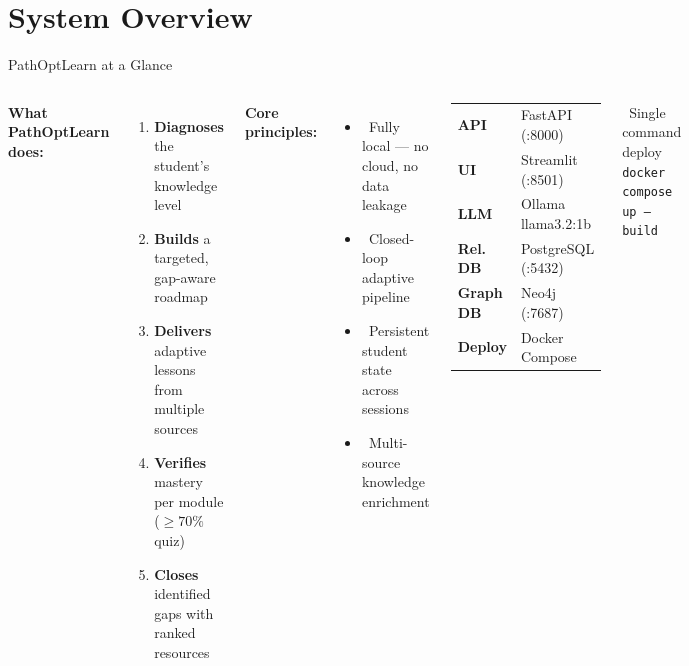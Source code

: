 \documentclass[aspectratio=169,9pt]{beamer}
\begin{document}
\section{System Overview}

\begin{frame}{PathOptLearn at a Glance}
\begin{columns}[T]
  \textbf{What PathOptLearn does:}
  \begin{enumerate}
    \item \textcolor{primary}{\textbf{Diagnoses}} the student's knowledge level
    \item \textcolor{accent}{\textbf{Builds}} a targeted, gap-aware roadmap
    \item \textcolor{success}{\textbf{Delivers}} adaptive lessons from multiple sources
    \item \textcolor{warning}{\textbf{Verifies}} mastery per module ($\geq 70\%$ quiz)
    \item \textcolor{danger}{\textbf{Closes}} identified gaps with ranked resources
  \end{enumerate}

  \vspace{0.3cm}
  \textbf{Core principles:}
  \begin{itemize}
    \item \faLock\ Fully local — no cloud, no data leakage
    \item \faRecycle\ Closed-loop adaptive pipeline
    \item \faDatabase\ Persistent student state across sessions
    \item \faSearch\ Multi-source knowledge enrichment
  \end{itemize}

  \begin{resultbox}[title={Tech Stack at a Glance}]
    \small
    \begin{tabular}{ll}
      \textbf{API}      & FastAPI (:8000)      \\
      \textbf{UI}       & Streamlit (:8501)    \\
      \textbf{LLM}      & Ollama llama3.2:1b   \\
      \textbf{Rel. DB}  & PostgreSQL (:5432)   \\
      \textbf{Graph DB} & Neo4j (:7687)        \\
      \textbf{Deploy}   & Docker Compose       \\
    \end{tabular}
  \end{resultbox}

  \vspace{0.3cm}
  \begin{alertblock}{\faTerminal\ Single command deploy}
    \texttt{\small docker compose up --build}
  \end{alertblock}
\end{columns}
\end{frame}
\end{document}
